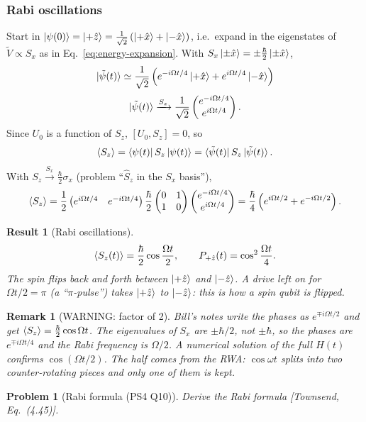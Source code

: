 \documentclass{article}
\newtheorem{problem}{Problem}
\newtheorem{remark}{Remark}
\newtheorem{result}{Result}
\begin{document}
\subsubsection{Rabi oscillations}
Start in $\ket{\psi(0)} = \ket{+\hat{z}} = \frac{1}{\sqrt{2}}\left(\ket{+\hat{x}} + \ket{-\hat{x}}\right)$, i.e.\ expand in the eigenstates of $\tilde{V} \propto S_x$ as in Eq.~\eqref{eq:energy-expansion}. With $S_x\ket{\pm\hat{x}} = \pm\frac{\hbar}{2}\ket{\pm\hat{x}}$,
\[\ket{\tilde{\psi}(t)} \simeq \frac{1}{\sqrt{2}}\left(e^{-i\Omega t/4}\ket{+\hat{x}} + e^{i\Omega t/4}\ket{-\hat{x}}\right)\]
\[\ket{\tilde{\psi}(t)} \xrightarrow{S_x} \frac{1}{\sqrt{2}}\begin{pmatrix} e^{-i\Omega t/4} \\ e^{i\Omega t/4} \end{pmatrix}.\]
Since $U_0$ is a function of $S_z$, $[U_0,S_z] = 0$, so
\[\braket{S_z} = \bra{\psi(t)}S_z\ket{\psi(t)} = \bra{\tilde{\psi}(t)}S_z\ket{\tilde{\psi}(t)}.\]
With $S_z \xrightarrow{S_x} \frac{\hbar}{2}\sigma_x$ (problem ``$\hat{S}_z$ in the $S_x$ basis''),
\[\braket{S_z} = \frac{1}{2}\begin{pmatrix} e^{i\Omega t/4} & e^{-i\Omega t/4} \end{pmatrix}\frac{\hbar}{2}\begin{pmatrix} 0 & 1 \\ 1 & 0 \end{pmatrix}\begin{pmatrix} e^{-i\Omega t/4} \\ e^{i\Omega t/4} \end{pmatrix} = \frac{\hbar}{4}\left(e^{i\Omega t/2} + e^{-i\Omega t/2}\right).\]
\begin{result}[Rabi oscillations]
    \begin{equation}
        \braket{S_z(t)} = \frac{\hbar}{2}\cos\frac{\Omega t}{2}, \qquad P_{+\hat{z}}(t) = \cos^2\frac{\Omega t}{4}.
    \end{equation}
    The spin flips back and forth between $\ket{+\hat{z}}$ and $\ket{-\hat{z}}$. A drive left on for $\Omega t/2 = \pi$ (a ``$\pi$-pulse'') takes $\ket{+\hat{z}}$ to $\ket{-\hat{z}}$: this is how a spin qubit is flipped.
\end{result}
\begin{remark}[WARNING: factor of 2]
    Bill's notes write the phases as $e^{\mp i\Omega t/2}$ and get $\braket{S_z} = \frac{\hbar}{2}\cos\Omega t$. The eigenvalues of $S_x$ are $\pm\hbar/2$, not $\pm\hbar$, so the phases are $e^{\mp i\Omega t/4}$ and the Rabi frequency is $\Omega/2$. A numerical solution of the full $H(t)$ confirms $\cos(\Omega t/2)$. The half comes from the RWA: $\cos\omega t$ splits into two counter-rotating pieces and only one of them is kept.
\end{remark}
\begin{problem}[Rabi formula (PS4 Q10)]
    Derive the Rabi formula [Townsend, Eq.~(4.45)].
\end{problem}
\end{document}
